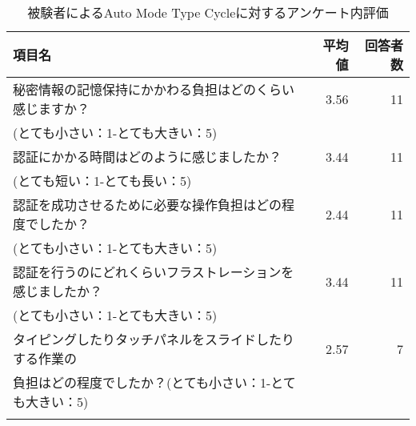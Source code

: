 \begin{table}[ht]
  \caption{被験者によるAuto Mode Type Cycleに対するアンケート内評価}
  \label{tab:auto_cycle.enquete}
  \begin{center}
    \small
    \begin{tabular}{lrr}
      \bhline
      項目名 & 平均値 & 回答者数 \\ \hline
      秘密情報の記憶保持にかかわる負担はどのくらい感じますか？ & 3.56 & 11 \\
      (とても小さい：1-とても大きい：5) & & \\
      認証にかかる時間はどのように感じましたか？ & 3.44 & 11 \\
      (とても短い：1-とても長い：5) & & \\
      認証を成功させるために必要な操作負担はどの程度でしたか？ & 2.44 & 11 \\
      (とても小さい：1-とても大きい：5) & & \\
      認証を行うのにどれくらいフラストレーションを感じましたか？ & 3.44 & 11 \\
      (とても小さい：1-とても大きい：5) & & \\
      タイピングしたりタッチパネルをスライドしたりする作業の & 2.57 & 7 \\
      負担はどの程度でしたか？(とても小さい：1-とても大きい：5) & & \\
      \bhline
    \end{tabular}
  \end{center}
\end{table}



